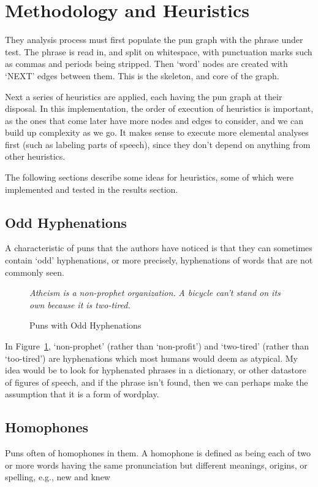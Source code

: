 
\section{Methodology and Heuristics}
They analysis process must first populate the pun graph with the phrase under test. The phrase is read in, and split on whitespace, with punctuation marks such as commas and periods being stripped. Then `word' nodes are created with `NEXT' edges between them. This is the skeleton, and core of the graph. 

Next a series of heuristics are applied, each having the pun graph at their disposal. In this implementation, the order of execution of heuristics is important, as the ones that come later have more nodes and edges to consider, and we can build up complexity as we go. It makes sense to execute more elemental analyses first (such as labeling parts of speech), since they don't  depend on anything from other heuristics.

The following sections describe some ideas for heuristics, some of which were implemented and tested in the results section.

\subsection{Odd Hyphenations}
A characteristic of puns that the authors have noticed is that they can sometimes contain `odd' hyphenations, or more precisely, hyphenations of words that are not commonly seen.

\begin{figure}[h]
\begin{mdframed}
  \emph{Atheism is a non-prophet organization.}
  \emph{A bicycle can't stand on its own because it is two-tired.}
  \caption{Puns with Odd Hyphenations}
 \label{oddhyphen}
\end{mdframed}
\end{figure}

In Figure~\ref{oddhyphen}, `non-prophet' (rather than `non-profit') and `two-tired' (rather than `too-tired') are hyphenations which most humans would deem as atypical. My idea would be to look for hyphenated phrases in a dictionary, or other datastore of figures of speech, and if the phrase isn't found, then we can perhaps make the assumption that it is a form of wordplay. 

\subsection{Homophones}
Puns often of homophones in them. A homophone is defined as being each of two or more words having the same pronunciation but different meanings, origins, or spelling, e.g., new and knew

